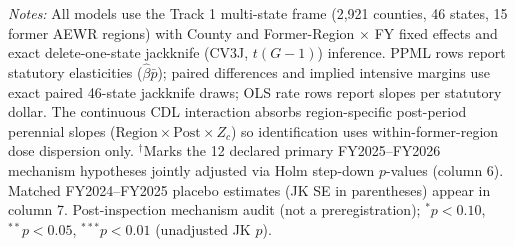 \begin{table}[!htbp]
\begin{minipage}{0.96\linewidth}
\textit{Notes:} All models use the Track 1 multi-state frame (2,921 counties, 46 states, 15 former AEWR regions) with County and Former-Region $\times$ FY fixed effects and exact delete-one-state jackknife (CV3J, $t(G-1)$) inference. PPML rows report statutory elasticities ($\hat{\beta}\bar{p}$); paired differences and implied intensive margins use exact paired 46-state jackknife draws; OLS rate rows report slopes per statutory dollar. The continuous CDL interaction absorbs region-specific post-period perennial slopes ($\text{Region} \times \text{Post} \times Z_c$) so identification uses within-former-region dose dispersion only. $^{\dagger}$Marks the 12 declared primary FY2025--FY2026 mechanism hypotheses jointly adjusted via Holm step-down $p$-values (column 6). Matched FY2024--FY2025 placebo estimates (JK SE in parentheses) appear in column 7. Post-inspection mechanism audit (not a preregistration); $^{*}p<0.10$, $^{**}p<0.05$, $^{***}p<0.01$ (unadjusted JK $p$).
\end{minipage}
\end{table}
